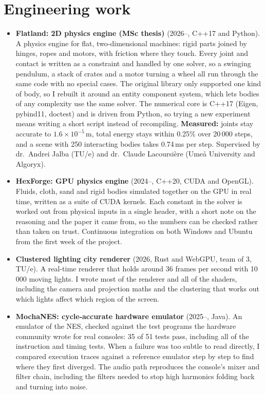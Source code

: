 \documentclass[10pt,a4paper]{article}
\newcommand{\proj}[3]{\item \textbf{#1} \textcolor{muted}{(#2).} #3}
\begin{document}
\section{Engineering work}
\begin{itemize}
\proj{Flatland: 2D physics engine (MSc thesis)}{2026--, C++17 and Python}{A physics engine for flat, two-dimensional machines: rigid parts joined by hinges, ropes and motors, with friction where they touch. Every joint and contact is written as a constraint and handled by one solver, so a swinging pendulum, a stack of crates and a motor turning a wheel all run through the same code with no special cases. The original library only supported one kind of body, so I rebuilt it around an entity component system, which lets bodies of any complexity use the same solver. The numerical core is C++17 (Eigen, pybind11, doctest) and is driven from Python, so trying a new experiment means writing a short script instead of recompiling. \textbf{Measured:} joints stay accurate to $1.6\times10^{-5}$\,m, total energy stays within 0.25\% over 20\,000 steps, and a scene with 250 interacting bodies takes 0.74\,ms per step. Supervised by dr.\ Andrei Jalba (TU/e) and dr.\ Claude Lacoursi\`ere (Ume\aa{} University and Algoryx).}
\proj{HexForge: GPU physics engine}{2024--, C++20, CUDA and OpenGL}{Fluids, cloth, sand and rigid bodies simulated together on the GPU in real time, written as a suite of CUDA kernels. Each constant in the solver is worked out from physical inputs in a single header, with a short note on the reasoning and the paper it came from, so the numbers can be checked rather than taken on trust. Continuous integration on both Windows and Ubuntu from the first week of the project.}
\proj{Clustered lighting city renderer}{2026, Rust and WebGPU, team of 3, TU/e}{A real-time renderer that holds around 36 frames per second with 10\,000 moving lights. I wrote most of the renderer and all of the shaders, including the camera and projection maths and the clustering that works out which lights affect which region of the screen.}
\proj{MochaNES: cycle-accurate hardware emulator}{2025--, Java}{An emulator of the NES, checked against the test programs the hardware community wrote for real consoles: 35 of 51 tests pass, including all of the instruction and timing tests. When a failure was too subtle to read directly, I compared execution traces against a reference emulator step by step to find where they first diverged. The audio path reproduces the console's mixer and filter chain, including the filters needed to stop high harmonics folding back and turning into noise.}

\end{itemize}
\end{document}
